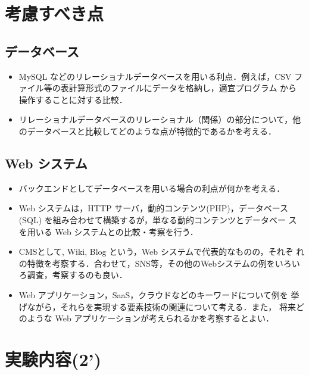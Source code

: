 \section{考慮すべき点}

\subsection*{データベース}
\begin{itemize}
 \item MySQL などのリレーショナルデータべースを用いる利点．例えば，CSV
       ファイル等の表計算形式のファイルにデータを格納し，適宜プログラム
       から操作することに対する比較．
 \item リレーショナルデータベースのリレーショナル（関係）の部分について，他のデータベースと比較してどのような点が特徴的であるかを考える．
\end{itemize}

\subsection*{Web システム}
\begin{itemize}
 \item バックエンドとしてデータベースを用いる場合の利点が何かを考える．
 \item Web システムは，HTTP サーバ，動的コンテンツ(PHP)，データベース
       (SQL) を組み合わせて構築するが，単なる動的コンテンツとデータベー
       スを用いる Web システムとの比較・考察を行う．
 \item CMSとして, Wiki, Blog という，Web システムで代表的なものの，それぞ
       れの特徴を考察する．合わせて，SNS等，その他のWebシステムの例をいろいろ調査，考察するのも良い．
 \item Web アプリケーション，SaaS，クラウドなどのキーワードについて例を
       挙げながら，それらを実現する要素技術の関連について考える．また，
       将来どのような Web アプリケーションが考えられるかを考察するとよい．
\end{itemize}

\clearpage


\section{実験内容(2’)}

